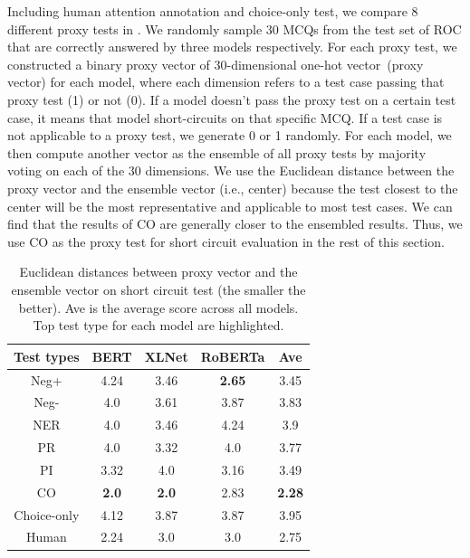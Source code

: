Including human attention annotation and choice-only test, we compare 8 different 
proxy tests in . 
We randomly sample 30 MCQs from the test set of ROC that are correctly answered 
by three models respectively. 
For each proxy test, we constructed a binary proxy vector 
of 30-dimensional one-hot vector~(proxy vector) for each model, where each dimension refers to 
a test case passing that proxy test (1) or not (0). If a model doesn't pass the proxy test 
on a certain test case, it means that model short-circuits on that specific MCQ. 
If a test case is not applicable to a proxy test, we generate 0 or 1 randomly.
For each model, we then compute another vector as the ensemble of all proxy tests by 
majority voting on each of the 30 dimensions. We use the Euclidean distance between the 
proxy vector and the ensemble vector (i.e., center) because the test 
closest to the center will be the most 
representative and applicable to most test cases.  
We can find that the results of CO are generally closer to the ensembled results. 
Thus, we use CO as the proxy test for short circuit evaluation in the rest of
this section. 

\begin{table}[t]
	\scriptsize
	\centering
	\begin{tabular}{c|cccc}\hline
		\toprule  
		\textbf{Test types} &BERT  & XLNet & RoBERTa  &Ave\\ 
		\midrule
		{Neg+}      &  4.24   	&   3.46  &	\textbf{2.65}	&3.45\\
		\midrule
		{Neg-}&   4.0 	&       3.61  &	3.87	&3.83\\
		\midrule
		{NER}    &   4.0 	&  3.46      &	4.24	&3.9\\
		\midrule
		{PR}&    4.0 	&    3.32   &	4.0	&3.77\\
		\midrule
		{PI}&   3.32 	&    4.0    &	3.16	&3.49\\
		\midrule
		{CO}  &      \textbf{2.0}   	&  \textbf{ 2.0} &	2.83	&\textbf{2.28}\\
		\midrule
		{Choice-only}   &  4.12  	&3.87  &	3.87	&3.95\\
		\midrule
		{Human}   & 2.24	&   3.0&	3.0	&2.75\\
		\bottomrule
		\hline
	\end{tabular}
	\caption{\label{tab:agree} 
		Euclidean distances between proxy vector and 
		the ensemble vector on short circuit test (the smaller
		the better). 
		Ave is the average score across all models.
		Top test type for each model are highlighted.}
\end{table}

